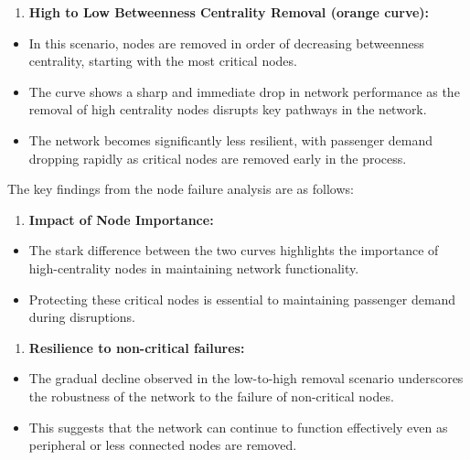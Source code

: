 \documentclass[
  letterpaper,
  DIV=11,
  numbers=noendperiod]{scrartcl}
\providecommand{\tightlist}{%
  \setlength{\itemsep}{0pt}\setlength{\parskip}{0pt}}\usepackage{longtable,booktabs,array}
\begin{document}
\begin{enumerate}
\def\labelenumi{\arabic{enumi}.}
\setcounter{enumi}{1}
\tightlist
\item
  \textbf{High to Low Betweenness Centrality Removal (orange curve):}
\end{enumerate}

\begin{itemize}
\tightlist
\item
  In this scenario, nodes are removed in order of decreasing betweenness
  centrality, starting with the most critical nodes.
\item
  The curve shows a sharp and immediate drop in network performance as
  the removal of high centrality nodes disrupts key pathways in the
  network.
\item
  The network becomes significantly less resilient, with passenger
  demand dropping rapidly as critical nodes are removed early in the
  process.
\end{itemize}

The key findings from the node failure analysis are as follows:

\begin{enumerate}
\def\labelenumi{\arabic{enumi}.}
\tightlist
\item
  \textbf{Impact of Node Importance:}
\end{enumerate}

\begin{itemize}
\tightlist
\item
  The stark difference between the two curves highlights the importance
  of high-centrality nodes in maintaining network functionality.
\item
  Protecting these critical nodes is essential to maintaining passenger
  demand during disruptions.
\end{itemize}

\begin{enumerate}
\def\labelenumi{\arabic{enumi}.}
\setcounter{enumi}{1}
\tightlist
\item
  \textbf{Resilience to non-critical failures:}
\end{enumerate}

\begin{itemize}
\tightlist
\item
  The gradual decline observed in the low-to-high removal scenario
  underscores the robustness of the network to the failure of
  non-critical nodes.
\item
  This suggests that the network can continue to function effectively
  even as peripheral or less connected nodes are removed.
\end{itemize}
\end{document}
